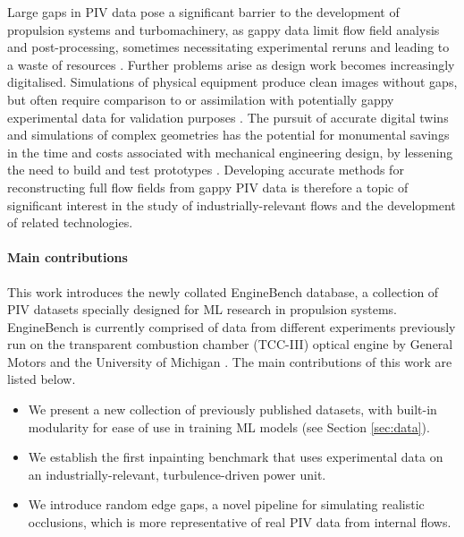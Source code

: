 \documentclass{article}
\begin{document}
Large gaps in PIV data pose a significant barrier to the development of propulsion systems and turbomachinery, as gappy data limit flow field analysis and post-processing, sometimes necessitating experimental reruns and leading to a waste of resources 
\cite{murray2007application}. Further problems arise as design work becomes increasingly digitalised. Simulations of physical equipment produce clean images without gaps, but often require comparison to or assimilation with potentially gappy experimental data for validation purposes \cite{chandramouli20204d,anderson1995computational}. The pursuit of accurate digital twins and simulations of complex geometries has the potential for monumental savings in the time and costs associated with mechanical engineering design, by lessening the need to build and test prototypes \cite{brunton2021data,argyropoulos2015recent}. Developing accurate methods for reconstructing full flow fields from gappy PIV data is therefore a topic of significant interest in the study of industrially-relevant flows and the development of related technologies.

\paragraph{Main contributions}
This work introduces the newly collated EngineBench database, a collection of PIV datasets specially designed for ML research in propulsion systems. EngineBench is currently comprised of data from different experiments previously run on the transparent combustion chamber (TCC-III) optical engine by General Motors and the University of Michigan \cite{schiffmann2016tcc}. The main contributions of this work are listed below.
\begin{itemize}
    \item We present a new collection of previously published datasets, with built-in modularity for ease of use in training ML models (see Section \ref{sec:data}).
    \item We establish the first inpainting benchmark that uses experimental data on an industrially-relevant, turbulence-driven power unit.
    \item We introduce random edge gaps, a novel pipeline for simulating realistic occlusions, which is more representative of  real PIV data from internal flows.
\end{itemize}
\end{document}
